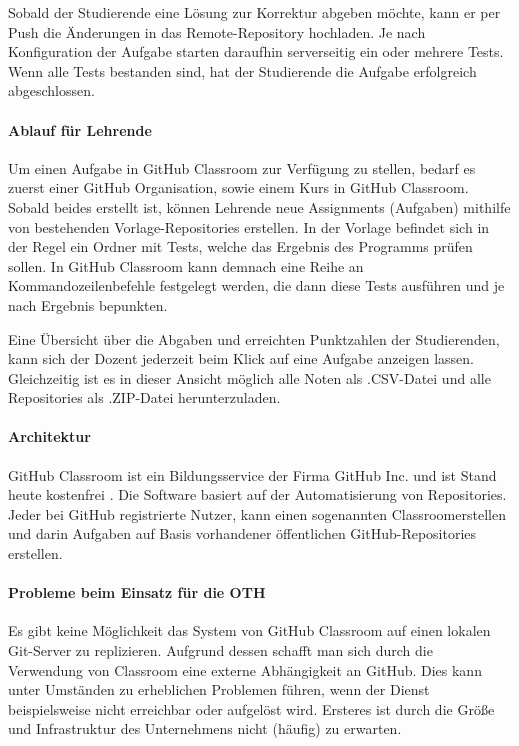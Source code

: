 Sobald der Studierende eine Lösung zur Korrektur abgeben möchte, kann er per
Push die Änderungen in das Remote-Repository hochladen. Je nach Konfiguration
der Aufgabe starten daraufhin serverseitig ein oder mehrere Tests. Wenn alle
Tests bestanden sind, hat der Studierende die Aufgabe erfolgreich abgeschlossen.

\paragraph{Ablauf für Lehrende}
Um einen Aufgabe in GitHub Classroom zur Verfügung zu stellen, bedarf es zuerst
einer GitHub Organisation, sowie einem Kurs in GitHub Classroom. Sobald beides
erstellt ist, können Lehrende neue Assignments (Aufgaben) mithilfe von
bestehenden Vorlage-Repositories erstellen. In der Vorlage befindet sich in der
Regel ein Ordner mit Tests, welche das Ergebnis des Programms prüfen sollen.
In GitHub Classroom kann demnach eine Reihe an Kommandozeilenbefehle festgelegt
werden, die dann diese Tests ausführen und je nach Ergebnis bepunkten.

Eine Übersicht über die Abgaben und erreichten Punktzahlen der Studierenden,
kann sich der Dozent jederzeit beim Klick auf eine Aufgabe anzeigen lassen.
Gleichzeitig ist es in dieser Ansicht möglich alle Noten als .CSV-Datei und
alle Repositories als .ZIP-Datei herunterzuladen.

\paragraph{Architektur} %
GitHub Classroom ist ein Bildungsservice der Firma GitHub Inc. und ist Stand
heute kostenfrei \parencite{github-classroom-kostenlos}. Die Software basiert
auf der Automatisierung von Repositories. Jeder bei GitHub registrierte Nutzer,
kann einen sogenannten \glqq Classroom\grqq erstellen und darin Aufgaben auf
Basis vorhandener öffentlichen GitHub-Repositories erstellen.

\paragraph{Probleme beim Einsatz für die OTH}
Es gibt keine Möglichkeit das System von GitHub Classroom auf einen lokalen
Git-Server zu replizieren. Aufgrund dessen schafft man sich durch die
Verwendung von Classroom eine externe Abhängigkeit an GitHub. Dies kann unter
Umständen zu erheblichen Problemen führen, wenn der Dienst beispielsweise
nicht erreichbar oder aufgelöst wird. Ersteres ist durch die Größe und
Infrastruktur des Unternehmens nicht (häufig) zu erwarten.

